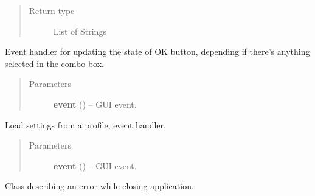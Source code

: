 \documentclass[letterpaper,10pt,english]{sphinxmanual}
\begin{document}
\begin{fulllineitems}
\begin{fulllineitems}
\begin{quote}
\begin{description}
\item[{Return type}] \leavevmode
List of Strings

\end{description}\end{quote}

\end{fulllineitems}


\begin{fulllineitems}
\label{dialogs:dialogs.ChooseDiwaProfileDialog.OnComboBox}
Event handler for updating the state of OK button, depending
if there's anything selected in the combo-box.
\begin{quote}\begin{description}
\item[{Parameters}] \leavevmode
\textbf{event} () -- GUI event.

\end{description}\end{quote}

\end{fulllineitems}


\begin{fulllineitems}
\label{dialogs:dialogs.ChooseDiwaProfileDialog.SelectDiwaProfile}
Load settings from a profile, event handler.
\begin{quote}\begin{description}
\item[{Parameters}] \leavevmode
\textbf{event} () -- GUI event.

\end{description}\end{quote}

\end{fulllineitems}


\end{fulllineitems}


\begin{fulllineitems}
\label{dialogs:dialogs.CloseError}
Class describing an error while closing application.

\end{fulllineitems}
\end{document}

